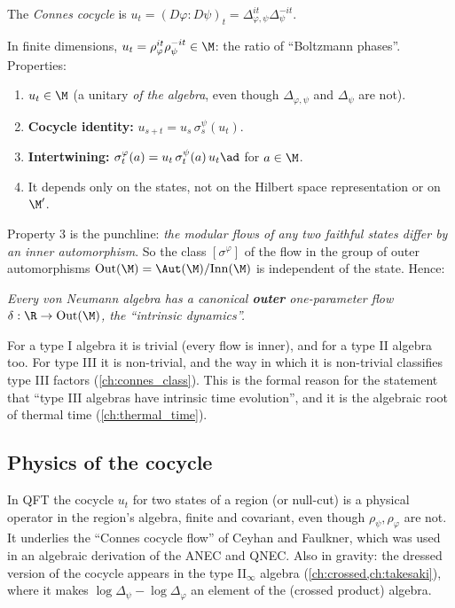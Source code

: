 \begin{definition}
The \emph{Connes cocycle} is $u_t=(D\varphi:D\psi)_t=\Delta_{\varphi,\psi}^{it}\Delta_\psi^{-it}$.
\end{definition}
In finite dimensions, $u_t=\rho_\varphi^{it}\rho_\psi^{-it}\in\M$: the ratio of ``Boltzmann phases''. Properties:
\begin{enumerate}
\item $u_t\in\M$ (a unitary \emph{of the algebra}, even though $\Delta_{\varphi,\psi}$ and $\Delta_\psi$ are not).
\item \textbf{Cocycle identity:} $u_{s+t}=u_s\,\sigma^\psi_s(u_t)$.
\item \textbf{Intertwining:} $\sigma^\varphi_t(a)=u_t\,\sigma^\psi_t(a)\,u_t\ad$ for $a\in\M$.
\item It depends only on the states, not on the Hilbert space representation or on $\M'$.
\end{enumerate}
Property 3 is the punchline: \emph{the modular flows of any two faithful states differ by an inner automorphism}. So the class $[\sigma^\varphi]$ of the flow in the group of outer automorphisms $\mathrm{Out}(\M)=\Aut(\M)/\mathrm{Inn}(\M)$ is independent of the state. Hence:

\begin{center}
\emph{Every von Neumann algebra has a canonical \textbf{outer} one-parameter flow $\delta:\R\to\mathrm{Out}(\M)$, the ``intrinsic dynamics''.}
\end{center}
For a type I algebra it is trivial (every flow is inner), and for a type II algebra too. For type III it is non-trivial, and the way in which it is non-trivial classifies type III factors (\cref{ch:connes_class}). This is the formal reason for the statement that ``type III algebras have intrinsic time evolution'', and it is the algebraic root of thermal time (\cref{ch:thermal_time}).

\subsection*{Physics of the cocycle}
In QFT the cocycle $u_t$ for two states of a region (or null-cut) is a physical operator in the region's algebra, finite and covariant, even though $\rho_\psi,\rho_\varphi$ are not. It underlies the ``Connes cocycle flow'' of Ceyhan and Faulkner, which was used in an algebraic derivation of the ANEC and QNEC. Also in gravity: the dressed version of the cocycle appears in the type II$_\infty$ algebra (\cref{ch:crossed,ch:takesaki}), where it makes $\log\Delta_\psi-\log\Delta_\varphi$ an element of the (crossed product) algebra.

